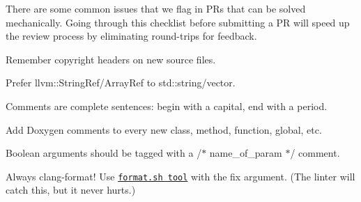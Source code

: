 There are some common issues that we flag in P\+Rs that can be solved mechanically. Going through this checklist before submitting a PR will speed up the review process by eliminating round-\/trips for feedback.


\begin{DoxyItemize}
\item Remember copyright headers on new source files.
\item Prefer {\ttfamily llvm\+::\+String\+Ref}/{\ttfamily Array\+Ref} to {\ttfamily std\+::string}/{\ttfamily vector}.
\item Comments are complete sentences\+: begin with a capital, end with a period.
\item Add Doxygen comments to every new class, method, function, global, etc.
\item Boolean arguments should be tagged with a /$\ast$ name\+\_\+of\+\_\+param $\ast$/ comment.
\item Always clang-\/format! Use \href{https://github.com/pytorch/glow/blob/master/utils/format.sh}{\tt format.\+sh tool} with the {\ttfamily fix} argument. (The linter will catch this, but it never hurts.) 
\end{DoxyItemize}